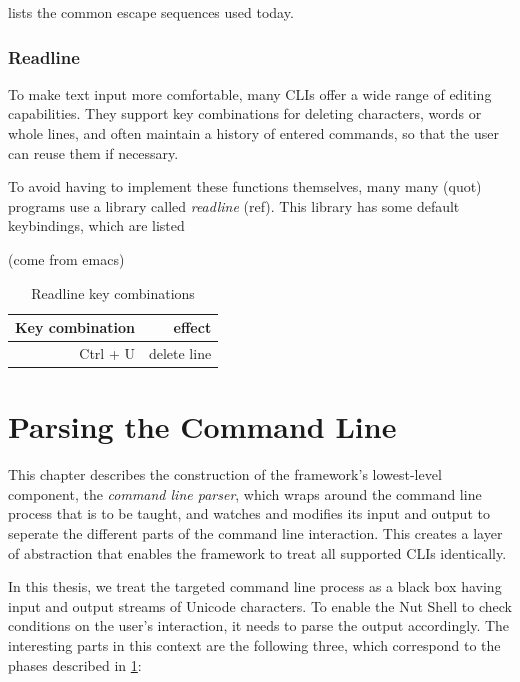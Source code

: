 \documentclass[paper=a4,twoside,abstract=on,cleardoublepage=empty,numbers=noenddot,toc=bib,11pt,appendixprefix=true]{scrreprt}
\begin{document}
 lists the common escape sequences used today.

\subsection{Readline}

To make text input more comfortable, many CLIs offer a wide range of editing capabilities. They support key combinations for deleting characters, words or whole lines, and often maintain a history of entered commands, so that the user can reuse them if necessary.

To avoid having to implement these functions themselves, many many (quot) programs use a library called \emph{readline} (ref). This library has some default keybindings, which are listed

(come from emacs)

\begin{table}[tb]
    \begin{tabular}{r|r}
        Key combination & effect \\
        \hline
        Ctrl + U & delete line \\
    \end{tabular}
    \caption{Readline key combinations}
\end{table}


\chapter{Parsing the Command Line}
\label{sec:cli}

This chapter describes the construction of the framework's lowest-level component, the \emph{command line parser}, which wraps around the command line process that is to be taught, and watches and modifies its input and output to seperate the different parts of the command line interaction. This creates a layer of abstraction that enables the framework to treat all supported CLIs identically.

In this thesis, we treat the targeted command line process as a black box having input and output streams of Unicode characters. To enable the Nut Shell to check conditions on the user's interaction, it needs to parse the output accordingly. The interesting parts in this context are the following three, which correspond to the phases described in \cref{sec:cli}:
\end{document}
